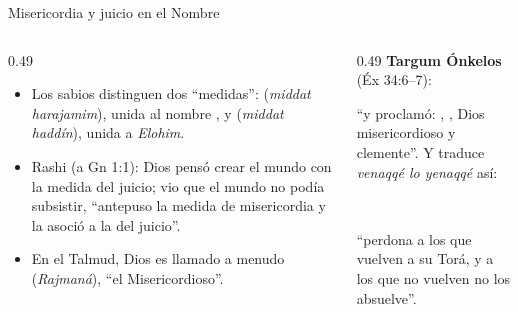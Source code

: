 \begin{frame}{Misericordia y juicio en el Nombre}
\begin{columns}[t,onlytextwidth]
\begin{column}{0.49\textwidth}\small
\begin{itemize}
\item Los sabios distinguen dos ``medidas'':  (\emph{middat harajamim}), unida al nombre , y  (\emph{middat haddín}), unida a \emph{Elohim}.
\item Rashi (a Gn 1:1): Dios pensó crear el mundo con la medida del juicio; vio que el mundo no podía subsistir, ``antepuso la medida de misericordia y la asoció a la del juicio''.
\item En el Talmud, Dios es llamado a menudo  (\emph{Rajmaná}), ``el Misericordioso''.
\end{itemize}
\end{column}
\begin{column}{0.49\textwidth}
\scriptsize\textbf{Targum Ónkelos} (Éx 34:6--7):
\begin{center}\end{center}
``y proclamó: \SENOR, \SENOR, Dios misericordioso y clemente''. Y traduce \emph{venaqqé lo yenaqqé} así:
\begin{center}\\ \end{center}
``perdona a los que vuelven a su Torá, y a los que no vuelven no los absuelve''.\par\smallskip
{}
\end{column}
\end{columns}
\end{frame}

